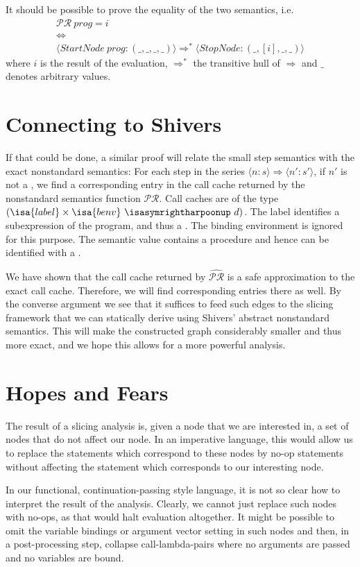 \documentclass[a4paper,parskip=half,BCOR=8mm,DIV=calc,12pt]{scrbook}
\newcommand{\PR}{\mathcal {PR}}
\newcommand{\aPR}{\widehat{\mathcal {PR}}}
\begin{document}
It should be possible to prove the equality of the two semantics, i.e.
\begin{gather*}
\PR\ prog = i\\
\iff\\
\langle StartNode\ prog : (\_,\_,\_,\_)\rangle \Rightarrow^* \langle StopNode : (\_,[i],\_,\_)\rangle
\end{gather*}
where $i$ is the result of the evaluation, $\Rightarrow^*$ the transitive hull of $\Rightarrow$ and $\_$ denotes arbitrary values.

\section{Connecting to Shivers}

If that could be done, a similar proof will relate the small step semantics with the exact nonstandard semantics: For each step in the series $\langle n:s\rangle \Rightarrow \langle n':s'\rangle$, if $n'$ is not a , we find a corresponding entry in the call cache returned by the nonstandard semantics function $\PR$. Call caches are of the type $(\isa{label}\times\isa{benv}\ \isasymrightharpoonup\ d)$. The label identifies a subexpression of the program, and thus a . The binding environment is ignored for this purpose. The semantic value  contains a procedure and hence can be identified with a .

We have shown that the call cache returned by $\aPR$ is a safe approximation to the exact call cache. Therefore, we will find corresponding entries there as well. By the converse argument we see that it suffices to feed such edges to the slicing framework that we can statically derive using Shivers’ abstract nonstandard semantics. This will make the constructed graph considerably smaller and thus more exact, and we hope this allows for a more powerful analysis.

\section{Hopes and Fears}

The result of a slicing analysis is, given a node that we are interested in, a set of nodes that do not affect our node. In an imperative language, this would allow us to replace the statements which correspond to these nodes by no-op statements without affecting the statement which corresponds to our interesting node.

In our functional, continuation-passing style language, it is not so clear how to interpret the result of the analysis. Clearly, we cannot just replace such nodes with no-ops, as that would halt evaluation altogether. It might be possible to omit the variable bindings or argument vector setting in such nodes and then, in a post-processing step, collapse call-lambda-pairs where no arguments are passed and no variables are bound.
\end{document}
